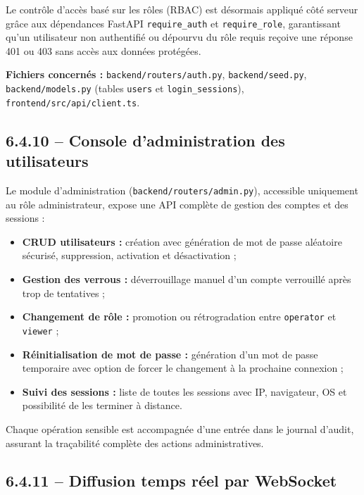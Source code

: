 \documentclass[11pt,a4paper]{report}
\begin{document}
Le contrôle d'accès basé sur les rôles (RBAC) est désormais appliqué côté
serveur grâce aux dépendances FastAPI \texttt{require\_auth} et
\texttt{require\_role}, garantissant qu'un utilisateur non authentifié ou
dépourvu du rôle requis reçoive une réponse 401 ou 403 sans accès aux
données protégées.

\textbf{Fichiers concernés :} \texttt{backend/routers/auth.py},
\texttt{backend/seed.py}, \texttt{backend/models.py} (tables \texttt{users}
et \texttt{login\_sessions}), \texttt{frontend/src/api/client.ts}.

\subsection*{6.4.10 -- Console d'administration des utilisateurs}

Le module d'administration (\texttt{backend/routers/admin.py}), accessible
uniquement au rôle administrateur, expose une API complète de gestion des
comptes et des sessions :

\begin{itemize}[label=\textbullet, leftmargin=1.5cm, labelsep=0.5cm,
                itemsep=0.1em, parsep=0em, topsep=0.2em]
    \item \textbf{CRUD utilisateurs :} création avec génération de mot de
    passe aléatoire sécurisé, suppression, activation et désactivation ;
    \item \textbf{Gestion des verrous :} déverrouillage manuel d'un compte
    verrouillé après trop de tentatives ;
    \item \textbf{Changement de rôle :} promotion ou rétrogradation entre
    \texttt{operator} et \texttt{viewer} ;
    \item \textbf{Réinitialisation de mot de passe :} génération d'un mot de
    passe temporaire avec option de forcer le changement à la prochaine
    connexion ;
    \item \textbf{Suivi des sessions :} liste de toutes les sessions avec IP,
    navigateur, OS et possibilité de les terminer à distance.
\end{itemize}

Chaque opération sensible est accompagnée d'une entrée dans le journal
d'audit, assurant la traçabilité complète des actions administratives.

\subsection*{6.4.11 -- Diffusion temps réel par WebSocket}
\end{document}
